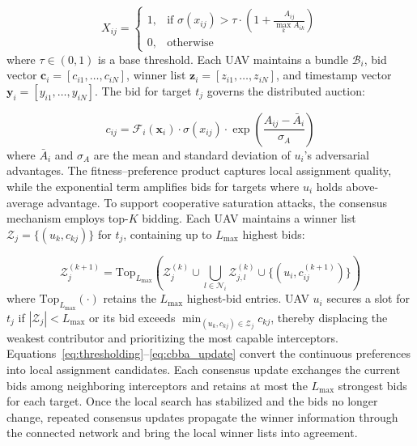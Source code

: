 \documentclass[lettersize,journal]{IEEEtran}
\newcommand{\hladd}[1]{{\color{blue}#1}}
\begin{document}
\begin{equation}
\label{eq:thresholding}
X_{ij} = 
\begin{cases}
1, & \text{if } \sigma(x_{ij}) > \tau \cdot \left(1 + \frac{A_{ij}}{\max_k A_{ik}}\right) \\
0, & \text{otherwise}
\end{cases}
\end{equation}
where $\tau \in (0,1)$ is a base threshold. Each UAV maintains a bundle $\mathcal{B}_i$, bid vector $\mathbf{c}_i = [c_{i1}, \dots, c_{iN}]$, winner list $\mathbf{z}_i = [z_{i1}, \dots, z_{iN}]$, and timestamp vector $\mathbf{y}_i = [y_{i1}, \dots, y_{iN}]$. The bid for target $t_j$ governs the distributed auction:

\begin{equation}
\label{eq:bid_formulation}
c_{ij} = \mathcal{F}_i(\mathbf{x}_i) \cdot \sigma(x_{ij}) \cdot \exp\left(\frac{A_{ij} - \bar{A}_i}{\sigma_A}\right)
\end{equation}
where $\bar{A}_i$ and $\sigma_A$ are the mean and standard deviation of $u_i$'s adversarial advantages. The fitness--preference product captures local assignment quality, while the exponential term amplifies bids for targets where $u_i$ holds above-average advantage. To support cooperative saturation attacks, the consensus mechanism employs top-$K$ bidding. Each UAV maintains a winner list $\mathcal{Z}_{j} = \{(u_k, c_{kj})\}$ for $t_j$, containing up to $L_{\max}$ highest bids:

\begin{equation}
\label{eq:cbba_update}
\mathcal{Z}_{j}^{(k+1)} = \text{Top}_{L_{\max}} \left( \mathcal{Z}_{j}^{(k)} \cup \bigcup_{l \in \mathcal{N}_i} \mathcal{Z}_{j,l}^{(k)} \cup \{(u_i, c_{ij}^{(k+1)})\} \right)
\end{equation}
where $\text{Top}_{L_{\max}}(\cdot)$ retains the $L_{\max}$ highest-bid entries. UAV $u_i$ secures a slot for $t_j$ if $|\mathcal{Z}_{j}| < L_{\max}$ or its bid exceeds $\min_{(u_k, c_{kj}) \in \mathcal{Z}_{j}} c_{kj}$, thereby displacing the weakest contributor and prioritizing the most capable interceptors.
\hladd{Equations~\eqref{eq:thresholding}--\eqref{eq:cbba_update}
convert the continuous preferences into local assignment candidates. Each
consensus update exchanges the current bids among neighboring interceptors
and retains at most the $L_{\max}$ strongest bids for each target. Once the
local search has stabilized and the bids no longer change, repeated consensus
updates propagate the winner information through the connected network and
bring the local winner lists into agreement.}
\end{document}
